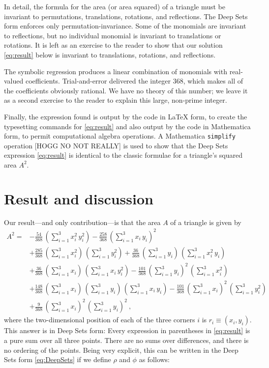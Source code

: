 \documentclass[12pt]{article}
\begin{document}


In detail, the formula for the area (or area squared) of a triangle must be invariant to permutations, translations, rotations, and reflections.
The Deep Sets form enforces only permutation-invariance.
Some of the monomials are invariant to reflections, but no individual monomial is invariant to translations or rotations.
It is left as an exercise to the reader to show that our solution \eqref{eq:result} below is invariant to translations, rotations, and reflections.

The symbolic regression produces a linear combination of monomials with real-valued coefficients.
Trial-and-error delivered the integer 368, which makes all of the coefficients obviously rational.
We have no theory of this number; we leave it as a second exercise to the reader to explain this large, non-prime integer.

Finally, the expression found is output by the code in LaTeX form, to create the typesetting commands for \eqref{eq:result} and also output by the code in Mathematica form, to permit computational algebra operations.
A Mathematica \texttt{simplify} operation [HOGG NO NOT REALLY] is used to show that the Deep Sets expression \eqref{eq:result} is identical to the classic formulae for a triangle's squared area $A^2$.

\section{Result and discussion}\label{sec:result}
Our result---and only contribution---is that the area $A$ of a triangle is given by
\begin{align}
A^2 = &
-\frac{ 54}{368}\,(\sum_{i=1}^3 x_i^2\,y_i^2) 
-\frac{258}{368}\,(\sum_{i=1}^3 x_i\,y_i)^2 \nonumber \\ &
+\frac{285}{368}\,(\sum_{i=1}^3 x_i^2)\,(\sum_{i=1}^3 y_i^2) 
+\frac{ 36}{368}\,(\sum_{i=1}^3 y_i)\,(\sum_{i=1}^3 x_i^2\,y_i) \nonumber \\ &
+\frac{ 36}{368}\,(\sum_{i=1}^3 x_i)\,(\sum_{i=1}^3 x_i\,y_i^2) 
-\frac{101}{368}\,(\sum_{i=1}^3 y_i)^2\,(\sum_{i=1}^3 x_i^2) \nonumber \\ &
+\frac{148}{368}\,(\sum_{i=1}^3 x_i)\,(\sum_{i=1}^3 y_i)\,(\sum_{i=1}^3 x_i\,y_i) 
-\frac{101}{368}\,(\sum_{i=1}^3 x_i)^2\,(\sum_{i=1}^3 y_i^2) \nonumber \\ &
+\frac{  9}{368}\,(\sum_{i=1}^3 x_i)^2\,(\sum_{i=1}^3 y_i)^2 ~, \label{eq:result}
\end{align}
where the two-dimensional position of each of the three corners $i$ is $r_i \equiv (x_i, y_i)$.
This answer is in Deep Sets form:
Every expression in parentheses in \eqref{eq:result} is a pure sum over all three points.
There are no sums over differences, and there is no ordering of the points.
Being very explicit, this can be written in the Deep Sets form \eqref{eq:DeepSets} if we define $\rho$ and $\phi$ as follows:
\end{document}
